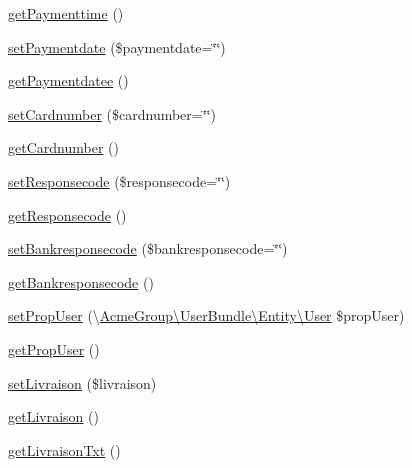 \begin{DoxyCompactItemize}
\hyperlink{class_acme_group_1_1_labo_bundle_1_1_entity_1_1facture_aedfc5b4f7fa4c31f1b3e4d9a08969576}{get\+Paymenttime} ()
\item 
\hyperlink{class_acme_group_1_1_labo_bundle_1_1_entity_1_1facture_a18adb28e17bd2e9fc7eedbffbda77063}{set\+Paymentdate} (\$paymentdate=\char`\"{}\char`\"{})
\item 
\hyperlink{class_acme_group_1_1_labo_bundle_1_1_entity_1_1facture_ad811b3d96559ab1ecad19de35ed34383}{get\+Paymentdatee} ()
\item 
\hyperlink{class_acme_group_1_1_labo_bundle_1_1_entity_1_1facture_abbcd6271c5941bfe21f8471c5e8cbacb}{set\+Cardnumber} (\$cardnumber=\char`\"{}\char`\"{})
\item 
\hyperlink{class_acme_group_1_1_labo_bundle_1_1_entity_1_1facture_ae3f10cccaf1984ca18491f9f1459c845}{get\+Cardnumber} ()
\item 
\hyperlink{class_acme_group_1_1_labo_bundle_1_1_entity_1_1facture_af3403ac2858a4ca0427a80a12800d1db}{set\+Responsecode} (\$responsecode=\char`\"{}\char`\"{})
\item 
\hyperlink{class_acme_group_1_1_labo_bundle_1_1_entity_1_1facture_a60c22ab7657184fb13ded5fe23008945}{get\+Responsecode} ()
\item 
\hyperlink{class_acme_group_1_1_labo_bundle_1_1_entity_1_1facture_a26499d0918e9f2e18ea1eb5cff96ab5d}{set\+Bankresponsecode} (\$bankresponsecode=\char`\"{}\char`\"{})
\item 
\hyperlink{class_acme_group_1_1_labo_bundle_1_1_entity_1_1facture_abb1693681b6e1ec420e354ed596951ca}{get\+Bankresponsecode} ()
\item 
\hyperlink{class_acme_group_1_1_labo_bundle_1_1_entity_1_1facture_a9540b1cc607d731fdd9501bc790b0f26}{set\+Prop\+User} (\textbackslash{}\hyperlink{class_acme_group_1_1_user_bundle_1_1_entity_1_1_user}{Acme\+Group\textbackslash{}\+User\+Bundle\textbackslash{}\+Entity\textbackslash{}\+User} \$prop\+User)
\item 
\hyperlink{class_acme_group_1_1_labo_bundle_1_1_entity_1_1facture_a9f3e6f9122c7c646d7a12e6ab16e8fd5}{get\+Prop\+User} ()
\item 
\hyperlink{class_acme_group_1_1_labo_bundle_1_1_entity_1_1facture_ac0e45f96dc0977ba5dc0277c0ae3df01}{set\+Livraison} (\$livraison)
\item 
\hyperlink{class_acme_group_1_1_labo_bundle_1_1_entity_1_1facture_a901245ca4115354debda6b89b3bdf4ae}{get\+Livraison} ()
\item 
\hyperlink{class_acme_group_1_1_labo_bundle_1_1_entity_1_1facture_a187540872e4d7fd5f3030f0ab12c6f3f}{get\+Livraison\+Txt} ()

\end{DoxyCompactItemize}
